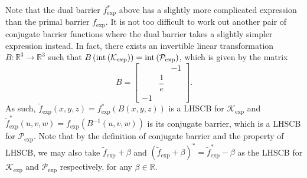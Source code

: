 \documentclass[10pt]{article}
\theoremstyle{definition}
\theoremstyle{plain}
\begin{document}
Note that the dual barrier $f_{\exp}^*$ above has a slightly more complicated expression than the primal barrier $f_{\exp}$. It is not too difficult to work out another pair of conjugate barrier functions where the dual barrier takes a slightly simpler expression instead. In fact, there exists an invertible linear transformation $B: \mathbb{R}^3 \rightarrow \mathbb{R}^3 $ such that $B\left(\textnormal{int} \left(\mathcal{K}_{\exp}\right)\right) = \textnormal{int} \left(\mathcal{P}_{\exp}\right)$, which is given by the matrix
\[ B =  \begin{bmatrix}
     &    & -1 \\[1ex]
     &  \dfrac{1}{e} &     \\[1ex]
 -1 &    & 
\end{bmatrix}. \]
As such, $\tilde{f}_{\exp}(x,y,z) = f^*_{\exp}(B (x,y,z))$ is a LHSCB for $\mathcal{K}_{\exp}$ and $\tilde{f}_{\exp}^*(u,v,w) = f_{\exp}(B^{-1}(u,v,w))$ is its conjugate barrier, which is a LHSCB for $\mathcal{P}_{\exp}$. Note that by the definition of conjugate barrier and the property of LHSCB, we may also take $\tilde{f}_{\exp} + \beta$ and $ \left(\tilde{f}_{\exp} + \beta\right)^* = \tilde{f}^*_{\exp} - \beta $ as the LHSCB for $\mathcal{K}_{\exp}$ and $\mathcal{P}_{\exp}$ respectively, for any $\beta \in \mathbb{R}$.
\end{document}
